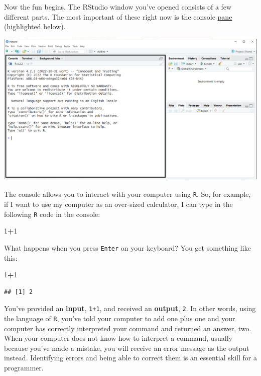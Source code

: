 \documentclass[
]{book}
\newenvironment{Shaded}{\begin{snugshade}}{\end{snugshade}}
\newcommand{\DecValTok}[1]{\textcolor[rgb]{0.00,0.00,0.81}{#1}}
\newcommand{\SpecialCharTok}[1]{\textcolor[rgb]{0.81,0.36,0.00}{\textbf{#1}}}
\begin{document}
Now the fun begins. The RStudio window you've opened consists of a few different parts. The most important of these right now is the console \href{https://docs.posit.co/ide/user/ide/guide/ui/ui-panes.html}{pane} (highlighted below).

\includegraphics{docs/_main_files/figure-html/RStudio console box.png}

The console allows you to interact with your computer using \texttt{R}. So, for example, if I want to use my computer as an over-sized calculator, I can type in the following \texttt{R} code in the console:

\begin{Shaded}
\begin{Highlighting}[]
\DecValTok{1}\SpecialCharTok{+}\DecValTok{1}
\end{Highlighting}
\end{Shaded}

What happens when you press \texttt{Enter} on your keyboard? You get something like this:

\begin{Shaded}
\begin{Highlighting}[]
\DecValTok{1}\SpecialCharTok{+}\DecValTok{1}
\end{Highlighting}
\end{Shaded}

\begin{verbatim}
## [1] 2
\end{verbatim}

You've provided an \textbf{input}, \texttt{1+1}, and received an \textbf{output}, \texttt{2}. In other words, using the language of \texttt{R}, you've told your computer to add one plus one and your computer has correctly interpreted your command and returned an answer, two. When your computer does not know how to interpret a command, usually because you've made a mistake, you will receive an error message as the output instead. Identifying errors and being able to correct them is an essential skill for a programmer.
\end{document}

